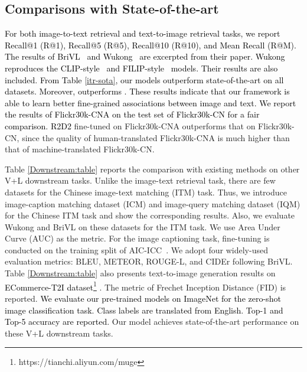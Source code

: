 \documentclass[sigconf]{acmart}
\def\jc{\textcolor{black}}
\def\xie{\textcolor{black}}
\def\blue{\textcolor{black}}
\def\ldw{\textcolor{black}}
\def\mmcr{\textcolor{black}}
\begin{document}
\subsection{Comparisons with State-of-the-art}\label{sec:SOTA}
\xie{For both image-to-text retrieval and text-to-image retrieval tasks, we report Recall@1 (R@1), Recall@5 (R@5), Recall@10 (R@10), and Mean Recall (R@M).
The results of BriVL~\cite{wenlan2} and Wukong~\cite{gu2022wukong} are excerpted from their paper. Wukong reproduces the CLIP-style~\cite{CLIP} and FILIP-style~\cite{filip} models.
\ldw{Their results are also included.}
From Table \ref{itr-sota}, our models outperform state-of-the-art on all datasets.
Moreover,  outperforms .}
\jc{These results indicate that our framework is able to learn better fine-grained associations between image and text.}
\jc{We report the results of Flickr30k-CNA on the test set of Flickr30k-CN for a fair comparison.} \mmcr{R2D2} fine-tuned on Flickr30k-CNA outperforms that on Flickr30k-CN, since the quality of human-translated Flickr30k-CNA is much higher than that of machine-translated Flickr30k-CN.
 

Table \ref{Downstream:table} reports the comparison with existing methods on other V+L downstream tasks. Unlike the image-text retrieval task, there are few datasets for the Chinese image-text matching (ITM) task. Thus, we introduce image-caption matching dataset (ICM) and image-query matching dataset (IQM) for the Chinese ITM task and show the corresponding results. 
Also, we evaluate Wukong and BriVL on these datasets for the ITM task.
We use Area Under Curve (AUC) as the metric. For the image captioning task, fine-tuning is conducted on the training split of AIC-ICC~\cite{aic}. We adopt four widely-used evaluation metrics: BLEU, METEOR, ROUGE-L, and CIDEr following BriVL. Table \ref{Downstream:table} also presents text-to-image generation results on \blue{ECommerce-T2I dataset\footnote{
https://tianchi.aliyun.com/muge} \cite{M6}}. The metric of Frechet Inception Distance (FID) is reported. \blue{We evaluate our pre-trained models on ImageNet\cite{imagenet} for the zero-shot image classification task. Class labels are translated from English. Top-1 and Top-5 accuracy are reported.}
Our model achieves state-of-the-art performance on these V+L downstream tasks. 
\end{document}
